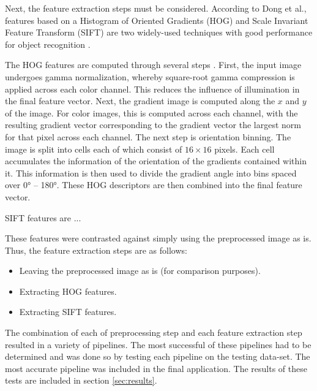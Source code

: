 \documentclass[letterpaper, 10 pt, conference]{conf/ieeeconf}  %
\begin{document}
Next, the feature extraction steps must be considered. According to Dong et al.,
features based on a Histogram of Oriented Gradients (HOG) and Scale Invariant
Feature Transform (SIFT) are two widely-used techniques with good performance
for object recognition \cite{Dong2010}.

The HOG features are computed through several steps \cite{Dalal2005}. First, the
input image undergoes gamma normalization, whereby square-root gamma compression
is applied across each color channel. This reduces the influence of illumination
in the final feature vector. Next, the gradient image is computed along the $x$
and $y$ of the image. For color images, this is computed across each channel,
with the resulting gradient vector corresponding to the gradient vector the
largest norm for that pixel across each channel. The next step is orientation
binning. The image is split into cells each of which consist of $16 \times 16$
pixels. Each cell accumulates the information of the orientation of the
gradients contained within it. This information is then used to divide the
gradient angle into bins spaced over \ang{0} -- \ang{180}. These HOG descriptors
are then combined into the final feature vector.

SIFT features are ...
\lipsum[1]

These features were contrasted against simply using the preprocessed image as
is. Thus, the feature extraction steps are as follows:
\begin{itemize}
\item Leaving the preprocessed image as is (for comparison purposes).
\item Extracting HOG features.
\item Extracting SIFT features.
\end{itemize}

The combination of each of preprocessing step and each feature extraction step
resulted in a variety of pipelines. The most successful of these pipelines had
to be determined and was done so by testing each pipeline on the testing
data-set. The most accurate pipeline was included in the final application. The
results of these tests are included in section \ref{sec:results}.
\end{document}
